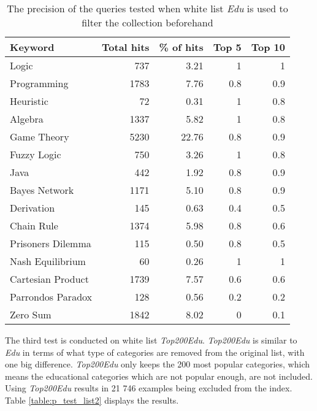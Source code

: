 \begin{table}[H]
\centering
\begin{tabular} {|| p{10em} | r | r | r | r ||} 
 \hline
 Keyword & Total hits & \% of hits & Top 5 & Top 10 \\ [0.5ex] 
 \hline

Logic & 737 & 3.21 & 1 & 1 \\
Programming & 1783 & 7.76 & 0.8 & 0.9 \\
Heuristic & 72 & 0.31 & 1 & 0.8 \\
Algebra & 1337 & 5.82 & 1 & 0.8 \\
Game Theory & 5230 & 22.76 & 0.8 & 0.9 \\
\hline
Fuzzy Logic & 750 & 3.26 & 1 & 0.8 \\
Java & 442 & 1.92 & 0.8 & 0.9 \\
Bayes Network & 1171 & 5.10 & 0.8 & 0.9 \\
Derivation & 145 & 0.63 & 0.4 & 0.5 \\
\hline
Chain Rule & 1374 & 5.98 & 0.8 & 0.6 \\
Prisoners Dilemma & 115 & 0.50 & 0.8 & 0.5 \\
Nash Equilibrium & 60 & 0.26 & 1 & 1 \\
Cartesian Product & 1739 & 7.57 & 0.6 & 0.6 \\
Parrondos Paradox & 128 & 0.56 & 0.2 & 0.2 \\
Zero Sum & 1842 & 8.02 & 0 & 0.1 \\

 \hline
\end{tabular}
\caption{The precision of the queries tested when white list \textit{Edu} is used to filter the collection beforehand}
\label{table:p_test_list1}
\end{table}

The third test is conducted on white list \textit{Top200Edu}. \textit{Top200Edu} is similar to \textit{Edu} in terms of what type of categories are removed from the original list, with one big difference. \textit{Top200Edu} only keeps the 200 most popular categories, which means the educational categories which are not popular enough, are not included. Using \textit{Top200Edu} results in 21 746 examples being excluded from the index. Table \ref{table:p_test_list2} displays the results.


